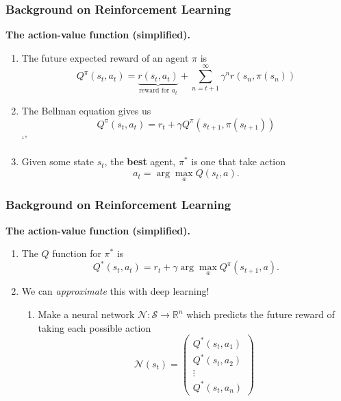 \documentclass{beamer}
\numberwithin{equation}{subsection}
\numberwithin{theorem}{subsection}
\def\scriptn{{\mathcal N}}
\def\scripts{{\mathcal S}}
\begin{document}
\begin{frame}
\frametitle{Background on Reinforcement Learning}
  \textbf{The action-value function (simplified).}
  \begin{enumerate}
    \item  The future expected reward of an agent $\pi$ is
    \begin{equation*}
      Q^\pi(s_t, a_t) = \underbrace{r(s_t, a_t)}_{\text{reward for } a_t} + \sum_{n={t+1}}^\infty \gamma^n r(s_n, \pi(s_n))
    \end{equation*}
    \item The Bellman equation gives us 
    \begin{equation*}
      Q^\pi(s_t, a_t) = r_t + \gamma Q^\pi(s_{t+1}, \pi(s_{t+1}))
    \end{equation*}`'
    \item Given some state $s_t$, the \textbf{best} agent, $\pi^*$ is one that take action 
    \begin{equation*}
      a_t = \arg \max_a Q(s_t, a).   
    \end{equation*}
  \end{enumerate}
\end{frame}

\begin{frame}
\frametitle{Background on Reinforcement Learning}
  \textbf{The action-value function (simplified).}
  \begin{enumerate}
    \item The $Q$ function for $\pi^*$ is
    \begin{equation*}
      Q^*(s_t, a_t) = r_t + \gamma \arg \max_a Q^\pi(s_{t+1}, a).
    \end{equation*}
    \item We can \emph{approximate} this with deep learning!
    \begin{enumerate}
      \item Make a neural network $\scriptn: \scripts \to \mathbb{R}^n$ which predicts 
      the future reward of taking each possible action
      \begin{equation*}
        \scriptn(s_t) =\begin{pmatrix}
            Q^*(s_t, a_1) \\
             Q^*(s_t, a_2)\\
             \vdots \\
              Q^*(s_t, a_n)
        \end{pmatrix}
      \end{equation*}
    \end{enumerate}
  \end{enumerate}
\end{frame}
\end{document}
